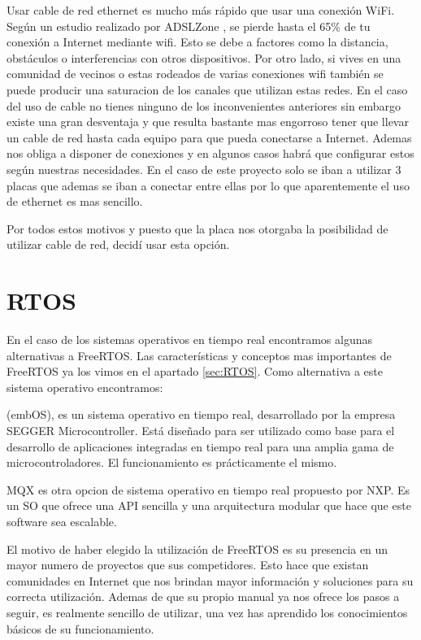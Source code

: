 Usar cable de red ethernet es mucho más rápido que usar una conexión WiFi. Según un estudio realizado por ADSLZone \cite{AdslWifivsEthernet}, se pierde hasta el 65\% de tu conexión a Internet mediante wifi. Esto se debe a factores como la distancia, obstáculos o interferencias con otros dispositivos. Por otro lado, si vives en una comunidad de vecinos o estas rodeados de varias conexiones wifi también se puede producir una saturacion de los canales que utilizan estas redes.
En el caso del uso de cable no tienes ninguno de los inconvenientes anteriores sin embargo existe una gran desventaja y que resulta bastante mas engorroso tener que llevar un cable de red hasta cada equipo para que pueda conectarse a Internet. Ademas nos obliga a disponer de conexiones  y en algunos casos habrá que configurar estos  según nuestras necesidades. En el caso de este proyecto solo se iban a utilizar 3 placas que ademas se iban a conectar entre ellas por lo que aparentemente el uso de ethernet es mas sencillo.

Por todos estos motivos y puesto que la placa nos otorgaba la posibilidad de utilizar cable de red, decidí usar esta opción.


\section{RTOS}\label{sec:ARRTOS}
En el caso de los sistemas operativos en tiempo real encontramos algunas alternativas a FreeRTOS. Las características y conceptos mas importantes de FreeRTOS ya los vimos en el apartado \ref{sec:RTOS}. Como alternativa a este sistema operativo encontramos: 
\begin{description}
\item {} (embOS), es un sistema operativo en tiempo real, desarrollado por la empresa SEGGER Microcontroller. Está diseñado para ser utilizado como base para el desarrollo de aplicaciones integradas en tiempo real para una amplia gama de microcontroladores. El funcionamiento es prácticamente el mismo.
\item MQX es otra opcion de sistema operativo en tiempo real propuesto por NXP. Es un SO que ofrece una API sencilla y una arquitectura modular que hace que este software sea escalable.
\end{description}
El motivo de haber elegido la utilización de FreeRTOS es su presencia en un mayor numero de proyectos que sus competidores. Esto hace que existan comunidades en Internet que nos brindan mayor información y soluciones para su correcta utilización. Ademas de que su propio manual ya nos ofrece los pasos a seguir, es realmente sencillo de utilizar, una vez has aprendido los conocimientos básicos de su funcionamiento.

